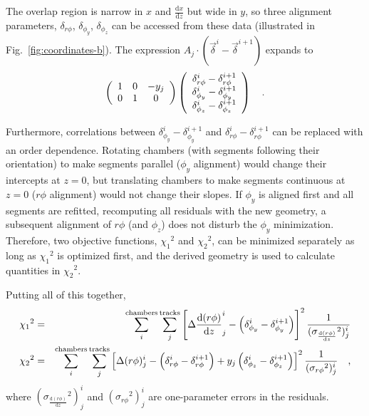 \documentclass[11pt,twoside,a4paper,cmspaper]{cms-tdr}
\begin{document}
The overlap region is narrow in $x$ and $\frac{\textrm{d}x}{\textrm{d}z}$ but wide in
$y$, so three alignment parameters, $\delta_{r\phi}$,
$\delta_{\phi_y}$, $\delta_{\phi_z}$ can be accessed from these data
(illustrated in Fig.~\ref{fig:coordinates-b}).  The expression
$A_j \cdot \left(\vec{\delta}^i - \vec{\delta}^{i+1}\right)$ expands to
\begin{equation}
\left(\begin{array}{c c c}
1 & 0 & -y_j \\
0 & 1 & 0 \\
\end{array}\right)
\left(\begin{array}{c}
\delta_{r\phi}^i - \delta_{r\phi}^{i+1} \\
\delta_{\phi_y}^i - \delta_{\phi_y}^{i+1} \\
\delta_{\phi_z}^i - \delta_{\phi_z}^{i+1} \\
\end{array}\right) \quad\mbox{.}
\end{equation}

Furthermore, correlations between $\delta_{\phi_y}^i
- \delta_{\phi_y}^{i+1}$ and $\delta_{r\phi}^i - \delta_{r\phi}^{i+1}$
can be replaced with an order dependence.  Rotating chambers (with
segments following their orientation) to make segments parallel
($\phi_y$ alignment) would change their intercepts at $z=0$,
but translating chambers to make segments continuous at $z=0$ ($r\phi$
alignment) would not change their slopes.  If
$\phi_y$ is aligned first and all segments are refitted, recomputing all residuals
with the new geometry, a subsequent alignment of $r\phi$ (and $\phi_z$) does not disturb
the $\phi_y$ minimization.  Therefore, two objective
functions, ${\chi_1}^2$ and ${\chi_2}^2$, can be minimized separately as long as
${\chi_1}^2$ is optimized first, and the derived geometry is used to calculate quantities in ${\chi_2}^2$.

Putting all of this together, 
\begin{eqnarray}
{\chi_1}^2 &=& \sum_i^{\mbox{\scriptsize chambers}} \sum_j^{\mbox{\scriptsize tracks}}
\left[ \Delta \frac{\textrm{d}(r\phi)}{\textrm{d}z}^i_j - \left(\delta_{\phi_y}^i
- \delta_{\phi_y}^{i+1}\right) \right]^2 \frac{1}{({\sigma_{\frac{\textrm{d}(r\phi)}{\textrm{d}z}}}^2)^i_j} \\
{\chi_2}^2 &=& \sum_i^{\mbox{\scriptsize chambers}} \sum_j^{\mbox{\scriptsize tracks}}
\left[ \Delta (r\phi)^i_j - \left(\delta_{r\phi}^i - \delta_{r\phi}^{i+1}\right)
+ y_j \left(\delta_{\phi_z}^i - \delta_{\phi_z}^{i+1}\right) \right]^2 \frac{1}{({\sigma_{r\phi}}^2)^i_j} \quad\mbox{,} \nonumber
\end{eqnarray}
where $({\sigma_{\frac{\textrm{d}(r\phi)}{\textrm{d}z}}}^2)^i_j$ and $({\sigma_{r\phi}}^2)^i_j$ are
one-parameter errors in the residuals.
\end{document}
